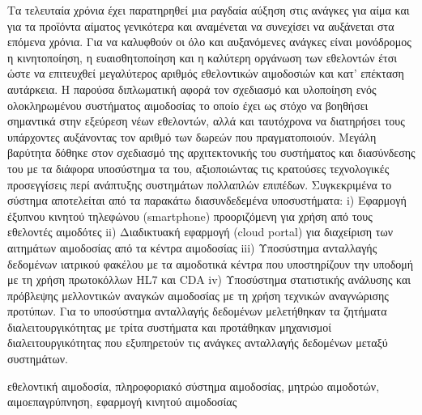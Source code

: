 \begin{abstractgr}
	Τα τελευταία χρόνια έχει παρατηρηθεί μια ραγδαία αύξηση στις ανάγκες για αίμα και για τα προϊόντα αίματος γενικότερα και αναμένεται να συνεχίσει να αυξάνεται στα επόμενα χρόνια. Για να καλυφθούν οι όλο και αυξανόμενες ανάγκες είναι μονόδρομος η κινητοποίηση, η ευαισθητοποίηση και η καλύτερη οργάνωση των εθελοντών έτσι ώστε να επιτευχθεί μεγαλύτερος αριθμός εθελοντικών αιμοδοσιών και κατ' επέκταση αυτάρκεια. Η παρούσα διπλωματική αφορά τον σχεδιασμό και υλοποίηση ενός ολοκληρωμένου συστήματος αιμοδοσίας το οποίο έχει ως στόχο να βοηθήσει σημαντικά στην εξεύρεση νέων εθελοντών, αλλά και ταυτόχρονα να διατηρήσει τους υπάρχοντες αυξάνοντας τον αριθμό των δωρεών που πραγματοποιούν. Μεγάλη βαρύτητα δόθηκε στον σχεδιασμό της αρχιτεκτονικής του συστήματος και διασύνδεσης του με τα διάφορα υποσύστημα τα του, αξιοποιώντας τις κρατούσες
τεχνολογικές προσεγγίσεις περί ανάπτυξης συστημάτων πολλαπλών επιπέδων. Συγκεκριμένα το σύστημα αποτελείται από τα παρακάτω διασυνδεδεμένα υποσυστήματα: i) Εφαρμογή έξυπνου κινητού τηλεφώνου (smartphone) προοριζόμενη για χρήση από τους εθελοντές αιμοδότες ii) Διαδικτυακή εφαρμογή (cloud portal) για διαχείριση των αιτημάτων αιμοδοσίας από τα κέντρα αιμοδοσίας iii) Υποσύστημα ανταλλαγής δεδομένων ιατρικού φακέλου με τα αιμοδοτικά κέντρα που υποστηρίζουν την υποδομή με τη χρήση πρωτοκόλλων HL7 και CDA iv) Υποσύστημα στατιστικής ανάλυσης και πρόβλεψης μελλοντικών αναγκών αιμοδοσίας με τη χρήση τεχνικών αναγνώρισης προτύπων. Για το υποσύστημα ανταλλαγής δεδομένων μελετήθηκαν τα ζητήματα διαλειτουργικότητας με τρίτα συστήματα και προτάθηκαν μηχανισμοί διαλειτουργικότητας που εξυπηρετούν τις ανάγκες ανταλλαγής δεδομένων μεταξύ συστημάτων.
    \begin{keywordsgr}
		εθελοντική αιμοδοσία, πληροφοριακό σύστημα αιμοδοσίας, μητρώο αιμοδοτών, αιμοεπαγρύπνηση, εφαρμογή κινητού αιμοδοσίας
	\end{keywordsgr}
\end{abstractgr}

\begin{abstracten}
	\begin{keywordsen}
	\end{keywordsen}
\end{abstracten}

\begin{acknowledgementsgr}

\end{acknowledgementsgr}

